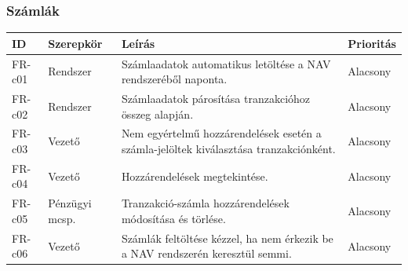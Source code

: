 \documentclass[a4paper,12pt]{article}
\begin{document}
\subsubsection{Számlák}
\begin{table}[H]
  \centering
  \begin{tabular}{llL{8.5cm}l}
  \toprule
  ID & Szerepkör & Leírás & Prioritás \\
  \midrule
  FR-c01 & Rendszer         & Számlaadatok automatikus letöltése a NAV rendszeréből naponta.                            & Alacsony\\
  FR-c02 & Rendszer         & Számlaadatok párosítása tranzakcióhoz összeg alapján.                                     & Alacsony\\
  FR-c03 & Vezető           & Nem egyértelmű hozzárendelések esetén a számla-jelöltek kiválasztása tranzakciónként.     & Alacsony\\
  FR-c04 & Vezető           & Hozzárendelések megtekintése.                                                             & Alacsony\\
  FR-c05 & Pénzügyi mcsp.   & Tranzakció-számla hozzárendelések módosítása és törlése.                                  & Alacsony\\
  FR-c06 & Vezető           & Számlák feltöltése kézzel, ha nem érkezik be a NAV rendszerén keresztül semmi.            & Alacsony\\
  \bottomrule
  \end{tabular}
\end{table}
\end{document}
